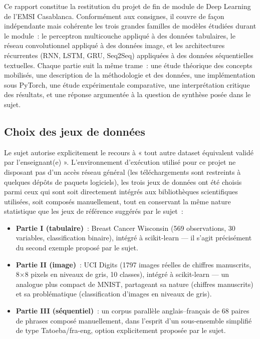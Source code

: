 \documentclass[11pt,a4paper]{article}
\begin{document}
Ce rapport constitue la restitution du projet de fin de module de Deep Learning de l'EMSI Casablanca. Conformément aux consignes, il couvre de façon indépendante mais cohérente les trois grandes familles de modèles étudiées durant le module~: le perceptron multicouche appliqué à des données tabulaires, le réseau convolutionnel appliqué à des données image, et les architectures récurrentes (RNN, LSTM, GRU, Seq2Seq) appliquées à des données séquentielles textuelles. Chaque partie suit la même trame~: une étude théorique des concepts mobilisés, une description de la méthodologie et des données, une implémentation sous PyTorch, une étude expérimentale comparative, une interprétation critique des résultats, et une réponse argumentée à la question de synthèse posée dans le sujet.

\subsection*{Choix des jeux de données}

Le sujet autorise explicitement le recours à « tout autre dataset équivalent validé par l'enseignant(e) ». L'environnement d'exécution utilisé pour ce projet ne disposant pas d'un accès réseau général (les téléchargements sont restreints à quelques dépôts de paquets logiciels), les trois jeux de données ont été choisis parmi ceux qui sont soit directement intégrés aux bibliothèques scientifiques utilisées, soit composés manuellement, tout en conservant la même nature statistique que les jeux de référence suggérés par le sujet~:

\begin{itemize}[leftmargin=1.2cm]
\item \textbf{Partie I (tabulaire)}~: Breast Cancer Wisconsin (569 observations, 30 variables, classification binaire), intégré à scikit-learn --- il s'agit précisément du second exemple proposé par le sujet.
\item \textbf{Partie II (image)}~: UCI Digits (1797 images réelles de chiffres manuscrits, 8$\times$8 pixels en niveaux de gris, 10 classes), intégré à scikit-learn --- un analogue plus compact de MNIST, partageant sa nature (chiffres manuscrits) et sa problématique (classification d'images en niveaux de gris).
\item \textbf{Partie III (séquentiel)}~: un corpus parallèle anglais--français de 68 paires de phrases composé manuellement, dans l'esprit d'un sous-ensemble simplifié de type Tatoeba/fra-eng, option explicitement proposée par le sujet.
\end{itemize}
\end{document}
